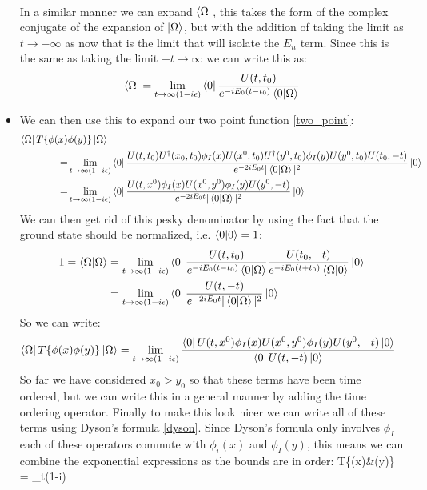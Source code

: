 \documentclass[11pt]{article}
\renewenvironment{flalign}{\vspace{-2mm}\empheq[box=\tcbhighmath]{align}}{\endempheq}
\numberwithin{equation}{section}
\begin{document}
\begin{itemize}
\begin{align*}
  \end{align*}
  In a similar manner we can expand $\bra{\Omega}$, this takes the form of the complex conjugate of the expansion of $\ket{\Omega}$, but with the addition of taking the limit as $t \rightarrow -\infty$ as now that is the limit that will isolate the $E_n$ term. Since this is the same as taking the limit $-t\rightarrow \infty$ we can write this as:
  \begin{align*}
    \bra{\Omega}=\lim_{t\rightarrow\infty(1-i\epsilon)}\bra{0}\frac{U(t,t_0)}{e^{-iE_0(t-t_0)}\braket{0|\Omega}}
  \end{align*}
  \item We can then use this to expand our two point function \ref{two_point}:
  \begin{align}
  \label{e^-iEt}
     \bra{\Omega}T\{\phi(x)&\phi(y)\}\ket{\Omega} \nonumber\\
      = & \lim_{t\rightarrow\infty(1-i\epsilon)}\bra{0}\frac{U(t,t_0)U^{\dagger}(x_0,t_0)\phi_I(x)U(x^0,t_0)U^{\dagger}(y^0,t_0)\phi_I(y)U(y^0,t_0)U(t_0,-t)}{e^{-2iE_0t}|\braket{0|\Omega}|^2}\ket{0} \nonumber \\
      = & \lim_{t\rightarrow\infty(1-i\epsilon)}\bra{0}\frac{U(t,x^0)\phi_I(x)U(x^0,y^0)\phi_I(y)U(y^0,-t)}{e^{-2iE_0t}|\braket{0|\Omega}|^2}\ket{0}
  \end{align}
  We can then get rid of this pesky denominator by using the fact that the ground state should be normalized, i.e. $\braket{0|0}=1$:
  \begin{align*}
    1= \braket{\Omega|\Omega} &= \lim_{t\rightarrow\infty(1-i\epsilon)}\bra{0}\frac{U(t,t_0)}{e^{-iE_0(t-t_0)}\braket{0|\Omega}}\frac{U(t_0,-t)}{e^{-iE_0(t+t_0)}\braket{\Omega|0}}\ket{0} \\
    & = \lim_{t\rightarrow\infty(1-i\epsilon)}\bra{0}\frac{U(t,-t)}{e^{-2iE_0t}|\braket{0|\Omega}|^2}\ket{0}
  \end{align*}
  So we can write:
  \begin{align*}
    \bra{\Omega}T\{\phi(x)&\phi(y)\}\ket{\Omega} = \lim_{t\rightarrow\infty(1-i\epsilon)}\frac{\bra{0}U(t,x^0)\phi_I(x)U(x^0,y^0)\phi_I(y)U(y^0,-t)\ket{0}}{\bra{0}U(t,-t)\ket{0}}
  \end{align*}
  So far we have considered $x_0>y_0$ so that these terms have been time ordered, but we can write this in a general manner by adding the time ordering operator. Finally to make this look nicer we can write all of these terms using Dyson's formula \ref{dyson}. Since Dyson's formula only involves $\phi_I$ each of these operators commute with $\phi_i(x)$ and $\phi_I(y)$, this means we can combine the exponential expressions as the bounds are in order:  
    \begin{flalign}
    \label{2_point_inter}
    \bra{\Omega}T\{\phi(x)&\phi(y)\}\ket{\Omega} = \lim_{t\rightarrow\infty(1-i\epsilon)}
  \end{flalign}
\end{itemize}
\end{document}
